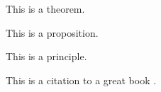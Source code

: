 \begin{theorem}
    This is a theorem.
\end{theorem}

\begin{proposition}
    This is a proposition.
\end{proposition}

\begin{definition}
    This is a principle.
\end{definition}

This is a citation to a great book \cite{atiyah1969introduction}.
